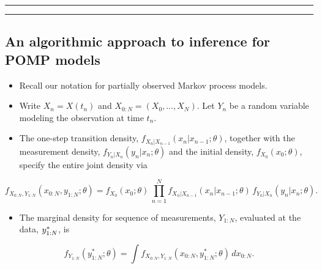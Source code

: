 \documentclass[]{article}
\providecommand{\tightlist}{%
  \setlength{\itemsep}{0pt}\setlength{\parskip}{0pt}}
\begin{document}
\begin{center}\rule{0.5\linewidth}{\linethickness}\end{center}

\begin{center}\rule{0.5\linewidth}{\linethickness}\end{center}

\subsection{An algorithmic approach to inference for POMP
models}\label{an-algorithmic-approach-to-inference-for-pomp-models}

\begin{itemize}
\item
  Recall our notation for partially observed Markov process models.
\item
  Write \(X_n=X(t_n)\) and \(X_{0:N}=(X_0,\dots,X_N)\). Let \(Y_n\) be a
  random variable modeling the observation at time \(t_n\).
\item
  The one-step transition density,
  \(f_{X_n|X_{n-1}}(x_n|x_{n-1};\theta)\), together with the measurement
  density, \(f_{Y_n|X_n}(y_n|x_n;\theta)\) and the initial density,
  \(f_{X_0}(x_0;\theta)\), specify the entire joint density via
\end{itemize}

\[f_{X_{0:N},Y_{1:N}}(x_{0:N},y_{1:N};\theta) = f_{X_0}(x_0;\theta)\,\prod_{n=1}^N\!f_{X_n | X_{n-1}}(x_n|x_{n-1};\theta)\,f_{Y_n|X_n}(y_n|x_n;\theta).\]

\begin{itemize}
\tightlist
\item
  The marginal density for sequence of measurements, \(Y_{1:N}\),
  evaluated at the data, \(y_{1:N}^*\), is
\end{itemize}

\[ f_{Y_{1:N}}(y^*_{1:N};\theta)=\int f_{X_{0:N},Y_{1:N}}(x_{0:N},y^*_{1:N};\theta)\, dx_{0:N}.
\]
\end{document}
